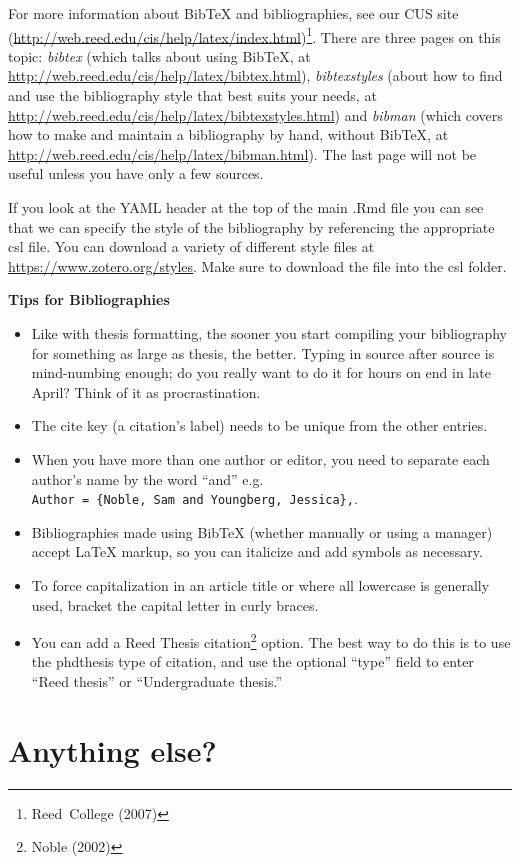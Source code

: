 \documentclass[12pt,twoside]{reedthesis}
\providecommand{\tightlist}{%
  \setlength{\itemsep}{0pt}\setlength{\parskip}{0pt}}
\theoremstyle{definition}
\theoremstyle{definition}
\theoremstyle{definition}
\theoremstyle{remark}
\begin{document}
For more information about BibTeX and bibliographies, see our CUS site
(\url{http://web.reed.edu/cis/help/latex/index.html})\footnote{Reed~College
  (2007)}. There are three pages on this topic: \emph{bibtex} (which
talks about using BibTeX, at
\url{http://web.reed.edu/cis/help/latex/bibtex.html}),
\emph{bibtexstyles} (about how to find and use the bibliography style
that best suits your needs, at
\url{http://web.reed.edu/cis/help/latex/bibtexstyles.html}) and
\emph{bibman} (which covers how to make and maintain a bibliography by
hand, without BibTeX, at
\url{http://web.reed.edu/cis/help/latex/bibman.html}). The last page
will not be useful unless you have only a few sources.

If you look at the YAML header at the top of the main .Rmd file you can
see that we can specify the style of the bibliography by referencing the
appropriate csl file. You can download a variety of different style
files at \url{https://www.zotero.org/styles}. Make sure to download the
file into the csl folder.

\textbf{Tips for Bibliographies}
\begin{itemize}
\tightlist
\item
  Like with thesis formatting, the sooner you start compiling your
  bibliography for something as large as thesis, the better. Typing in
  source after source is mind-numbing enough; do you really want to do
  it for hours on end in late April? Think of it as procrastination.
\item
  The cite key (a citation's label) needs to be unique from the other
  entries.
\item
  When you have more than one author or editor, you need to separate
  each author's name by the word ``and'' e.g.
  \texttt{Author\ =\ \{Noble,\ Sam\ and\ Youngberg,\ Jessica\},}.
\item
  Bibliographies made using BibTeX (whether manually or using a manager)
  accept LaTeX markup, so you can italicize and add symbols as
  necessary.
\item
  To force capitalization in an article title or where all lowercase is
  generally used, bracket the capital letter in curly braces.
\item
  You can add a Reed Thesis citation\footnote{Noble (2002)} option. The
  best way to do this is to use the phdthesis type of citation, and use
  the optional ``type'' field to enter ``Reed thesis'' or
  ``Undergraduate thesis.''
\end{itemize}
\section{Anything else?}\label{anything-else}
\end{document}
